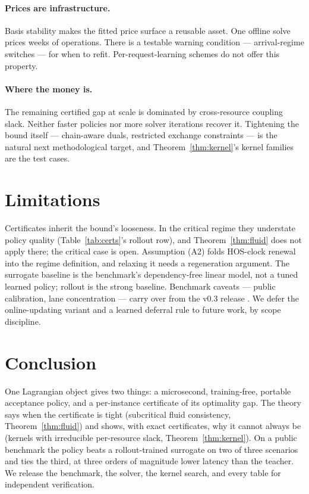 \documentclass[11pt]{article}
\begin{document}
\paragraph{Prices are infrastructure.} Basis stability makes the fitted
price surface a reusable asset. One offline solve prices weeks of
operations. There is a testable warning condition --- arrival-regime
switches --- for when to refit. Per-request-learning schemes do not
offer this property.

\paragraph{Where the money is.} The remaining certified gap at scale is
dominated by cross-resource coupling slack. Neither faster policies nor
more solver iterations recover it. Tightening the bound itself ---
chain-aware duals, restricted exchange constraints --- is the natural
next methodological target, and Theorem~\ref{thm:kernel}'s kernel
families are the test cases.

\section{Limitations}
\label{sec:limitations}

Certificates inherit the bound's looseness. In the critical regime they
understate policy quality (Table~\ref{tab:certs}'s rollout row), and
Theorem~\ref{thm:fluid} does not apply there; the critical case is
open. Assumption (A2) folds HOS-clock renewal into the regime
definition, and relaxing it needs a regeneration argument. The
surrogate baseline is the benchmark's dependency-free linear model, not
a tuned learned policy; rollout is the strong baseline. Benchmark
caveats --- public calibration, lane concentration --- carry over from
the v0.3 release \citep{chandrasekaran2026freightbidbench}. We defer
the online-updating variant and a learned deferral rule to future work,
by scope discipline.

\section{Conclusion}
\label{sec:conclusion}

One Lagrangian object gives two things: a microsecond, training-free,
portable acceptance policy, and a per-instance certificate of its
optimality gap. The theory says when the certificate is tight
(subcritical fluid consistency, Theorem~\ref{thm:fluid}) and shows,
with exact certificates, why it cannot always be (kernels with
irreducible per-resource slack, Theorem~\ref{thm:kernel}). On a public
benchmark the policy beats a rollout-trained surrogate on two of three
scenarios and ties the third, at three orders of magnitude lower
latency than the teacher. We release the benchmark, the solver, the
kernel search, and every table for independent verification.
\end{document}
